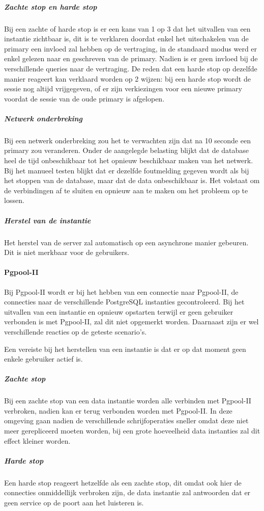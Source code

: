 \subparagraph{Zachte stop en harde stop} Bij een zachte of harde stop is er een kans van 1 op 3 dat het uitvallen van een instantie zichtbaar is, dit is te verklaren doordat enkel het uitschakelen van de primary een invloed zal hebben op de vertraging, in de standaard modus werd er enkel gelezen naar en geschreven van de primary. Nadien is er geen invloed bij de verschillende queries naar de vertraging. De reden dat een harde stop op dezelfde manier reageert kan verklaard worden op 2 wijzen: bij een harde stop wordt de sessie nog altijd vrijgegeven, of er zijn verkiezingen voor een nieuwe primary voordat de sessie van de oude primary is afgelopen. 

\subparagraph{Netwerk onderbreking} Bij een netwerk onderbreking zou het te verwachten zijn dat na 10 seconde een primary zou veranderen. Onder de aangelegde belasting blijkt dat de database heel de tijd onbeschikbaar tot het opnieuw beschikbaar maken van het netwerk. Bij het manueel testen blijkt dat er dezelfde foutmelding gegeven wordt als bij het stoppen van de database, maar dat de data onbeschikbaar is. Het volstaat om de verbindingen af te sluiten en opnieuw aan te maken om het probleem op te lossen.

\subparagraph{Herstel van de instantie} Het herstel van de server zal automatisch op een asynchrone manier gebeuren. Dit is niet merkbaar voor de gebruikers. 

\paragraph{Pgpool-II} Bij Pgpool-II wordt er bij het hebben van een connectie naar Pgpool-II, de connecties naar de verschillende PostgreSQL instanties gecontroleerd. Bij het uitvallen van een instantie en opnieuw opstarten terwijl er geen gebruiker verbonden is met Pgpool-II, zal dit niet opgemerkt worden. Daarnaast zijn er wel verschillende reacties op de geteste scenario's. 

Een vereiste bij het herstellen van een instantie is dat er op dat moment geen enkele gebruiker actief is. 

\subparagraph{Zachte stop} Bij een zachte stop van een data instantie worden alle verbinden met Pgpool-II verbroken, nadien kan er terug verbonden worden met Pgpool-II. In deze omgeving gaan nadien de verschillende schrijfoperaties sneller omdat deze niet meer gerepliceerd moeten worden, bij een grote hoeveelheid data instanties zal dit effect kleiner worden.  

\subparagraph{Harde stop} Een harde stop reageert hetzelfde als een zachte stop, dit omdat ook hier de connecties onmiddellijk verbroken zijn, de data instantie zal antwoorden dat er geen service op de poort aan het luisteren is. 

